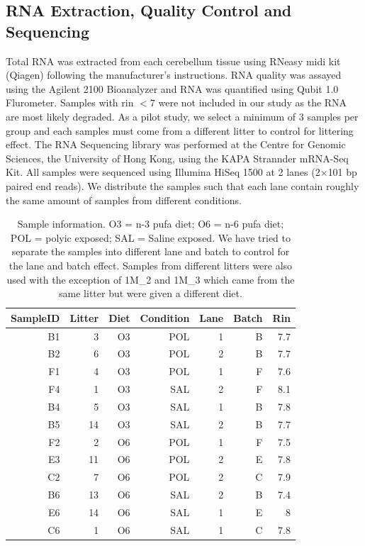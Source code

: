 \subsection{RNA Extraction, Quality Control and Sequencing}
Total RNA was extracted from each cerebellum tissue using RNeasy midi kit (Qiagen) following the manufacturer's instructions.
RNA quality was assayed using the Agilent 2100 Bioanalyzer and RNA was quantified using Qubit 1.0 Flurometer.
Samples with \gls{rin} $<7$ were not included in our study as the RNA are most likely degraded.
As a pilot study, we select a minimum of 3 samples per group and each samples must come from a different litter to control for littering effect.
The RNA Sequencing library was performed at the Centre for Genomic Sciences, the University of Hong Kong, using the KAPA Strannder mRNA-Seq Kit. 
All samples were sequenced using Illumina HiSeq 1500 at 2 lanes (2$\times$101 \gls{bp} paired end reads).
We distribute the samples such that each lane contain roughly the same amount of samples from different conditions.
\begin{table}
	\centering
	\begin{tabular}{rrrrrrr}
		\toprule
		SampleID & Litter & Diet & Condition & Lane & Batch & Rin\\
		\midrule
		B1&	3&	O3&	POL&	1&	B&	7.7\\
		B2&	6&	O3&	POL&	2&	B&	7.7\\
		F1&	4&	O3&	POL&	1&	F&	7.6\\
		F4&	1&	O3&	SAL&	2&	F&	8.1\\
		B4&	5&	O3&	SAL&	1&	B&	7.8\\
		B5&	14&	O3&	SAL&	2&	B&	7.7\\
		F2&	2&	O6&	POL&	1&	F&	7.5\\
		E3&	11&	O6&	POL&	2&	E&	7.8\\
		C2&	7&	O6&	POL&	2&	C&	7.9\\
		B6&	13&	O6&	SAL&	2&	B&	7.4\\
		E6&	14&	O6&	SAL&	1&	E&	8\\
		C6&	1&	O6&	SAL&	1&	C&	7.8\\
		\bottomrule
	\end{tabular}
	\caption[Sample Information]{
		Sample information.
		O3 = n-3 \gls{pufa} diet; O6 = n-6 \gls{pufa} diet; POL = \gls{polyic} exposed; SAL = Saline exposed.
		We have tried to separate the samples into different lane and batch to control for the lane and batch effect. 
		Samples from different litters were also used with the exception of 1M\_2 and 1M\_3 which came from the same litter but were given a different diet.
		\label{tab:sampleInfo}
	}
\end{table}

